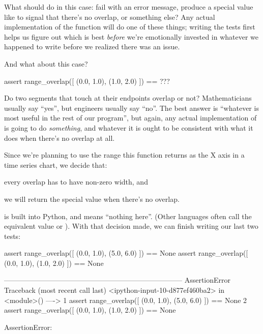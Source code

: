 What should  do in this case: fail with an error
message, produce a special value like  to signal that
there's no overlap, or something else? Any actual implementation of the
function will do one of these things; writing the tests first helps us
figure out which is best \emph{before} we're emotionally invested in
whatever we happened to write before we realized there was an issue.

And what about this case?

\begin{VerbIn}
assert range_overlap([ (0.0, 1.0), (1.0, 2.0) ]) == ???
\end{VerbIn}

Do two segments that touch at their endpoints overlap or not?
Mathematicians usually say ``yes'', but engineers usually say ``no''.
The best answer is ``whatever is most useful in the rest of our
program'', but again, any actual implementation of
 is going to do \emph{something}, and whatever it
is ought to be consistent with what it does when there's no overlap at
all.

Since we're planning to use the range this function returns as the X
axis in a time series chart, we decide that:

\begin{swcenumerate}
\item
  every overlap has to have non-zero width, and
\item
  we will return the special value  when there's no
  overlap.
\end{swcenumerate}

 is built into Python, and means ``nothing here''. (Other
languages often call the equivalent value  or
). With that decision made, we can finish writing our last
two tests:

\begin{VerbIn}
assert range_overlap([ (0.0, 1.0), (5.0, 6.0) ]) == None
assert range_overlap([ (0.0, 1.0), (1.0, 2.0) ]) == None
\end{VerbIn}

\begin{VerbErr}
---------------------------------------------------------------------------
AssertionError                            Traceback (most recent call last)
<ipython-input-10-d877ef460ba2> in <module>()
----> 1 assert range_overlap([ (0.0, 1.0), (5.0, 6.0) ]) == None
      2 assert range_overlap([ (0.0, 1.0), (1.0, 2.0) ]) == None

AssertionError: 
\end{VerbErr}

